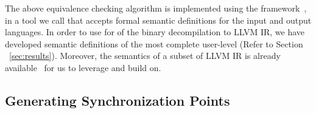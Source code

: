  The above equivalence checking algorithm is implemented using the \K
 framework~\cite{k-primer-2013-v32}, in a tool we call  that accepts
 formal semantic definitions for the input and output languages. In order to
 use  for \TV of the binary decompilation to LLVM IR, we have developed
 \K semantic definitions of the most complete user-level \ISA (Refer to Section
     ~\ref{sec:results}). Moreover, the semantics of a subset of LLVM IR is
 already available~\cite{LLVMSEMA} for us to leverage and build on.

\subsection{Generating Synchronization Points}

